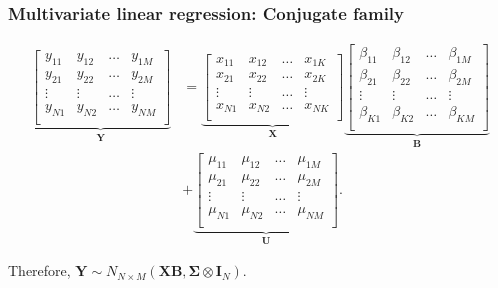 \documentclass[12pt, compress]{beamer}
\begin{document}
\begin{frame}
	\frametitle{Multivariate linear regression: Conjugate family}
{\scriptsize{
\begin{align*}
	\underbrace{
		\begin{bmatrix}
			y_{11} & y_{12} & \dots & y_{1M}\\
			y_{21} & y_{22} & \dots & y_{2M}\\
			\vdots & \vdots & \dots & \vdots\\
			y_{N1} & y_{N2} & \dots & y_{NM}\\
	\end{bmatrix}}_{\bm{Y}}
	&=
	\underbrace{\begin{bmatrix}
			x_{11} & x_{12} & \dots & x_{1K}\\
			x_{21} & x_{22} & \dots & x_{2K}\\
			\vdots & \vdots & \dots & \vdots\\
			x_{N1} & x_{N2} & \dots & x_{NK}\\
	\end{bmatrix}}_{\bm{X}}
	\underbrace{
		\begin{bmatrix}
			\beta_{11} & \beta_{12} & \dots & \beta_{1M}\\
			\beta_{21} & \beta_{22} & \dots & \beta_{2M}\\
			\vdots & \vdots & \dots & \vdots\\
			\beta_{K1} & \beta_{K2} & \dots & \beta_{KM}\\
	\end{bmatrix}}_{\bm{B}}\\
	&+
	\underbrace{\begin{bmatrix}
			\mu_{11} & \mu_{12} & \dots & \mu_{1M}\\
			\mu_{21} & \mu_{22} & \dots & \mu_{2M}\\
			\vdots & \vdots & \dots & \vdots\\
			\mu_{N1} & \mu_{N2} & \dots & \mu_{NM}\\
	\end{bmatrix}}_{\bm{U}}.
\end{align*}
}}

Therefore, ${\boldsymbol{Y}}\sim N_{N\times M}({\boldsymbol{X}}{\boldsymbol{B}},\boldsymbol{\Sigma}\otimes {\boldsymbol{I}}_N)$.
\end{frame}
\end{document}
